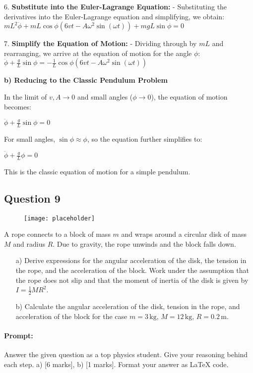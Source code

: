 \documentclass{article}
\begin{document}
6. \textbf{Substitute into the Euler-Lagrange Equation:}
   - Substituting the derivatives into the Euler-Lagrange equation and simplifying, we obtain:
     $mL^2 \ddot{\phi} + mL \cos \phi (6vt - A\omega^2 \sin(\omega t)) + mgL \sin \phi = 0$

7. \textbf{Simplify the Equation of Motion:}
   - Dividing through by $mL$ and rearranging, we arrive at the equation of motion for the angle $\phi$:
     $\ddot{\phi} + \frac{g}{L} \sin \phi = -\frac{1}{L} \cos \phi (6vt - A\omega^2 \sin(\omega t))$

\textbf{b) Reducing to the Classic Pendulum Problem}

In the limit of $v, A \to 0$ and small angles ($\phi \to 0$), the equation of motion becomes:

$\ddot{\phi} + \frac{g}{L} \sin \phi = 0$

For small angles, $\sin \phi \approx \phi$, so the equation further simplifies to:

$\ddot{\phi} + \frac{g}{L} \phi = 0$

This is the classic equation of motion for a simple pendulum.

\subsection{Question 9}

\begin{figure}[h!]
    \centering
    \texttt{[image: placeholder]}
    \caption*{}
\end{figure}

A rope connects to a block of mass $m$ and wraps around a circular disk of mass $M$ and radius $R$. Due to gravity, the rope unwinds and the block falls down.

\begin{itemize}
    \item[a)] Derive expressions for the angular acceleration of the disk, the tension in the rope, and the acceleration of the block. Work under the assumption that the rope does not slip and that the moment of inertia of the disk is given by $I = \frac{1}{2} M R^2$.
    
    \item[b)] Calculate the angular acceleration of the disk, tension in the rope, and acceleration of the block for the case $m = 3\, \text{kg}$, $M = 12\, \text{kg}$, $R = 0.2\, \text{m}$.
\end{itemize}

\paragraph{Prompt: \\} 
Answer the given question as a top physics student. Give your reasoning behind each step. a) [6 marks], b) [1 marks].
Format your answer as LaTeX code.
\end{document}
